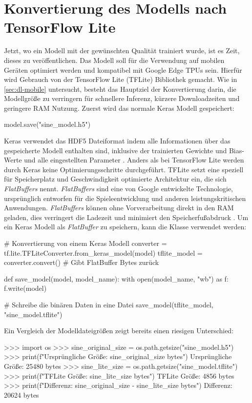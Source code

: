 \section{Konvertierung des Modells nach TensorFlow Lite}
Jetzt, wo ein Modell mit der gewünschten Qualität trainiert
wurde, ist es Zeit, dieses zu veröffentlichen.
Das Modell soll für die Verwendung auf mobilen Geräten optimiert werden
und kompatibel mit Google Edge TPUs sein.
Hierfür wird Gebrauch von der TensorFlow Lite (TFLite) Bibliothek gemacht.
Wie in \autoref{sec:dl-mobile} untersucht,
besteht das Hauptziel der Konvertierung darin, die Modellgröße zu verringern
für schnellere Inferenz, kürzere Downloadzeiten und geringere RAM Nutzung.
Zuerst wird das normale Keras Modell gespeichert:
\begin{pythoncode}
model.save("sine_model.h5")
\end{pythoncode}
Keras verwendet das HDF5 Dateiformat
indem alle Informationen über das gespeicherte Modell enthalten sind,
inklusive der trainierten Gewichte und Bias-Werte und alle eingestellten
Parameter \parencite[314]{book:hands-on-ml}.
Anders als bei TensorFlow Lite werden durch Keras keine Optimierungsschritte
durchgeführt.
TFLite setzt eine speziell für Speicherplatz und Geschwindigkeit
optimierte Architektur ein,
die sich \textit{FlatBuffers} nennt.
\textit{FlatBuffers} sind eine von Google
entwickelte Technologie, ursprünglich entworfen für die Spieleentwicklung
und anderen leistungskritischen Anwendungen.
\textit{FlatBuffers} können ohne Vorverarbeitung direkt in den RAM
geladen, dies verringert die Ladezeit
und minimiert den Speicherfußabdruck \parencite[685]{book:hands-on-ml}.
Um ein Keras Modell als \textit{FlatBuffer} zu speichern, kann die
 Klasse verwendet werden:
\begin{pythoncode}
# Konvertierung von einem Keras Modell
converter = tf.lite.TFLiteConverter.from_keras_model(model)
tflite_model = converter.convert() # Gibt FlatBuffer Bytes zurück

def save_model(model, model_name):
    with open(model_name, "wb") as f:
        f.write(model)

# Schreibe die binären Daten in eine Datei
save_model(tflite_model, "sine_model.tflite")
\end{pythoncode}
Ein Vergleich der Modelldateigrößen zeigt bereits einen riesigen Unterschied:
\begin{pyconcode}
>>> import os
>>> sine_original_size = os.path.getsize("sine_model.h5")
>>> print(f"Ursprüngliche Größe: {sine_original_size} bytes")
Ursprüngliche Größe: 25480 bytes
>>> sine_lite_size = os.path.getsize("sine_model.tflite")
>>> print(f"TFLite Größe: {sine_lite_size} bytes")
TFLite Größe: 4856 bytes
>>> print(f"Differenz: {sine_original_size - sine_lite_size} bytes")
Differenz: 20624 bytes
\end{pyconcode}
